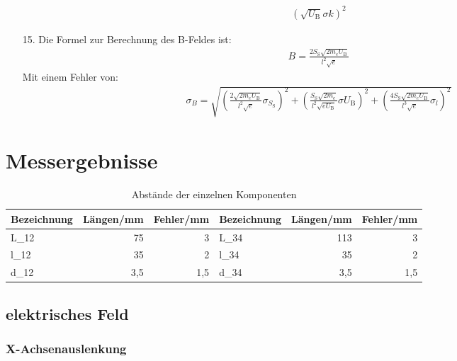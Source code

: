 \documentclass[12pt]{scrartcl}
\begin{document}
\begin{itemize}
\begin{align}
{\left(\sqrt{U_\text{B}}\sigma{k}\right)^2}
\label{eqn:AuslenkungSpulenspannung_sigma}
\end{align}
\item[15.]
Die Formel zur Berechnung des B-Feldes ist:
\begin{align}
B = \frac{2 S_\text{S}\sqrt{2 m_e U_\text{B}}}{l^2 \sqrt{e}}
\label{eqn:bfeld}
\end{align}
Mit einem Fehler von:
\begin{align}
\sigma_B = \sqrt{
\left(\frac{2 \sqrt{2 m_e U_\text{B}}}{l^2 \sqrt{e}}\sigma_{S_\text{S}}\right)^2+
\left(\frac{S_\text{S}\sqrt{2 m_e}}{l^2 \sqrt{e U_\text{B}}}\sigma{U_\text{B}}\right)^2+
\left(\frac{4 S_\text{S}\sqrt{2 m_e U_\text{B}}}{l^3 \sqrt{e}}\sigma_l\right)^2
}
\label{eqn:bfeld_sigma}
\end{align}
\end{itemize}

\section{Messergebnisse}

\begin{table}[htbp]
\caption{Abstände der einzelnen Komponenten}
\begin{center}
\begin{tabular}{|l|r|r|l|r|r|}
\hline
Bezeichnung & \multicolumn{1}{l|}{Längen/mm} & \multicolumn{1}{l|}{Fehler/mm} & Bezeichnung & \multicolumn{1}{l|}{Längen/mm} & \multicolumn{1}{l|}{Fehler/mm} \\ \hline
L\_12 & 75 & 3 & L\_34 & 113 & 3 \\ \hline
l\_12 & 35 & 2 & l\_34 & 35 & 2 \\ \hline
d\_12 & 3,5 & 1,5 & d\_34 & 3,5 & 1,5 \\ \hline
\end{tabular}
\end{center}
\label{tab:materialeigenschaften}
\end{table}

\newpage

\subsection{elektrisches Feld}
\subsubsection{X-Achsenauslenkung}
\end{document}
